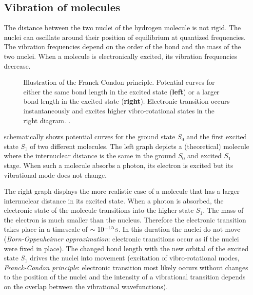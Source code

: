 \subsection{Vibration of molecules}
The distance between the two nuclei of the hydrogen molecule is not
rigid. The nuclei can oscillate around their position of equilibrium
at quantized frequencies. The vibration frequencies depend on the
order of the bond and the mass of the two nuclei. When a molecule is
electronically excited, its vibration frequencies decrease.
\begin{figure}[!hbt]
  \centering
  
  \caption{Illustration of the Franck-Condon principle. Potential
    curves for either the same bond length in the
    excited state ({\bf left}) or a larger bond length in the
    excited state ({\bf right}). Electronic transition occurs
    instantaneously and excites higher vibro-rotational states in the
    right diagram. \citep[inspired from][p.~276]{Haken2006}.}
  \label{fig:flu-condon}
\end{figure}

 schematically shows potential curves for the
ground state $S_0$ and the first excited state $S_1$ of two different
molecules. The left graph depicts a (theoretical) molecule where the
internuclear distance is the same in the ground $S_0$ and excited
$S_1$ stage. When such a molecule absorbs a photon, its electron is
excited but its vibrational mode does not change.

The right graph displays the more realistic case of a molecule that
has a larger internuclear distance in its excited state. When a photon
is absorbed, the electronic state of the molecule transitions into the
higher state $S_1$. The mass of the electron is much smaller than the
nucleus. Therefore the electronic transition takes place in a
timescale of $\unit[\sim10^{-15}]{s}$. In this duration the nuclei do
not move (\emph{Born-Oppenheimer approximation}: electronic
transitions occur as if the nuclei were fixed in place). The changed
bond length with the new orbital of the excited state $S_1$ drives the
nuclei into movement (excitation of vibro-rotational modes,
\emph{Franck-Condon principle}: electronic transition most likely
occurs without changes to the position of the nuclei and the intensity
of a vibrational transition depends on the overlap between the
vibrational wavefunctions).

